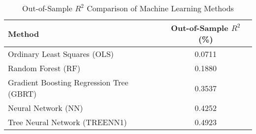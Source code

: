 
\begin{table}[htbp]
\centering
\caption{Out-of-Sample $R^2$ Comparison of Machine Learning Methods}
\label{tab:ml_comparison}
\begin{tabular}{lc}
\toprule
Method & Out-of-Sample $R^2$ (\%) \\
\midrule
Ordinary Least Squares (OLS) & 0.0711 \\
Random Forest (RF) & 0.1880 \\
Gradient Boosting Regression Tree (GBRT) & 0.3537 \\
Neural Network (NN) & 0.4252 \\
Tree Neural Network (TREENN1) & 0.4923 \\
\bottomrule
\end{tabular}
\end{table}
